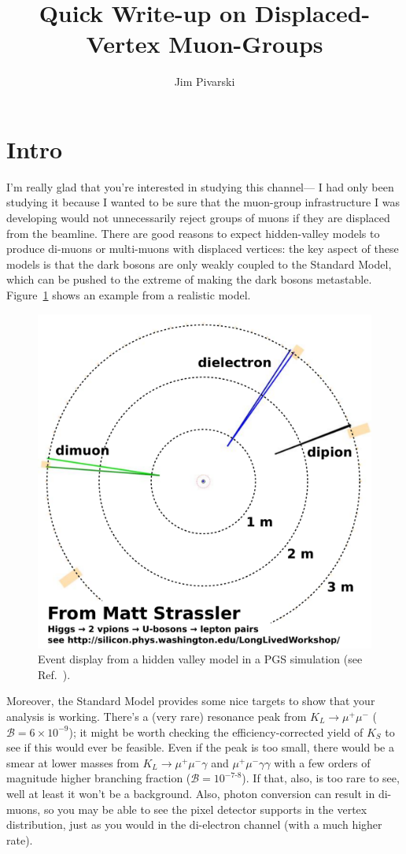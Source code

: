 \documentclass[12pt]{article}
\title{\huge \bf Quick Write-up on Displaced-Vertex Muon-Groups}
\author{Jim Pivarski}
\begin{document}
\maketitle

\section{Intro}

I'm really glad that you're interested in studying this channel--- I
had only been studying it because I wanted to be sure that the
muon-group infrastructure I was developing would not unnecessarily
reject groups of muons if they are displaced from the beamline.  There
are good reasons to expect hidden-valley models to produce di-muons or
multi-muons with displaced vertices: the key aspect of these models is
that the dark bosons are only weakly coupled to the Standard Model,
which can be pushed to the extreme of making the dark bosons
metastable.  Figure~\ref{fig:strassler} shows an example from a
realistic model.

\begin{figure}[h]
\begin{center}
\includegraphics[width=0.5\linewidth]{fig/displaced_vertex_mugroups/leptjets1e.pdf}
\end{center}

\caption{Event display from a hidden valley model in a PGS simulation
  (see Ref.~\cite{strassler}). \label{fig:strassler}}
\end{figure}

\pagebreak
Moreover, the Standard Model provides some nice targets to show that
your analysis is working.  There's a (very rare) resonance peak from
$K_L \to \mu^+\mu^-$ ($\mathcal{B} = 6\times 10^{-9}$); it might be
worth checking the efficiency-corrected yield of $K_S$ to see if this
would ever be feasible.  Even if the peak is too small, there would be
a smear at lower masses from $K_L \to \mu^+\mu^- \gamma$ and
$\mu^+\mu^- \gamma\gamma$ with a few orders of magnitude higher
branching fraction ($\mathcal{B} = 10^{-7\mbox{-}8}$).  If that, also,
is too rare to see, well at least it won't be a background.  Also,
photon conversion can result in di-muons\cite{geant}, so you may be
able to see the pixel detector supports in the vertex distribution,
just as you would in the di-electron channel (with a much higher rate).
\end{document}
